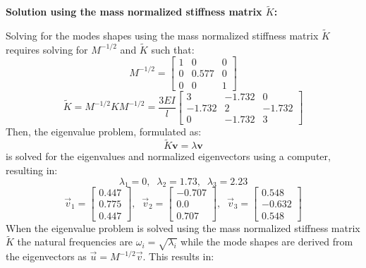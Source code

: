 \documentclass[12pt,letter]{article}
\begin{document}
\begin{example}
	\vspace{2ex}
	\noindent \textbf{Solution using the mass normalized stiffness matrix $\tilde{K}$:}
	\vspace{1ex}
	
	Solving for the modes shapes using the  mass normalized stiffness matrix $\tilde{K}$ requires solving for $M^{-1/2}$ and $\tilde{K}$ such that:
	\begin{equation}
		  M^{-1/2} = \begin{bmatrix} 1 & 0 & 0 \\    0  & 0.577 & 0 \\ 0  & 0 & 1 \end{bmatrix}
	\end{equation}
	\begin{equation}
		   \tilde{K} = M^{-1/2} K M^{-1/2} = \frac{3EI}{l} \begin{bmatrix} 3 & -1.732 & 0 \\  -1.732  & 2 & -1.732 \\  0  & -1.732 & 3 \end{bmatrix} 
	\end{equation}
	Then, the eigenvalue problem, formulated as:
	\begin{equation}
	\tilde{K} \textbf{v} = \lambda \textbf{v}
	\end{equation}
	is solved for the eigenvalues and normalized eigenvectors using a computer, resulting in:
	\begin{equation}
	\lambda_1 = 0, \; \; \lambda_2 = 1.73, \; \; \lambda_3 = 2.23
	\end{equation}
	\begin{equation}
	\vec{v}_1 = \begin{bmatrix} 0.447 \\    0.775 \\    0.447  \end{bmatrix}, \; \; \vec{v}_2 = \begin{bmatrix} -0.707 \\    0.0 \\    0.707 \end{bmatrix}, \; \; \vec{v}_3 = \begin{bmatrix} 0.548 \\    -0.632 \\    0.548  \end{bmatrix}
	\end{equation}
	When the eigenvalue problem is solved using the mass normalized stiffness matrix $\tilde{K}$ the natural frequencies are $\omega_i = \sqrt{\lambda_i}$ while the mode shapes are derived from the eigenvectors as $\vec{u}=M^{-1/2}\vec{v}$. This results in:

\end{example}
\end{document}
